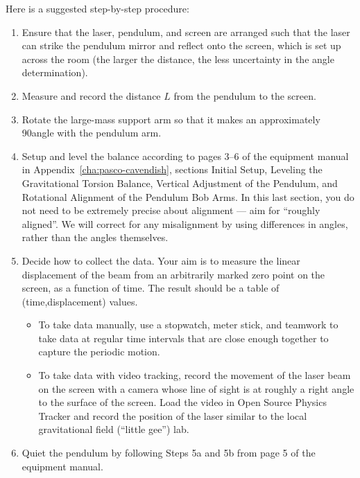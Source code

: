 Here is a suggested step-by-step procedure:
\begin{enumerate}
	
	\item Ensure that the laser, pendulum, and screen are arranged such that the laser can strike the pendulum mirror and reflect onto the screen, which is set up across the room (the larger the distance, the less uncertainty in the angle determination).
	
	\item Measure and record the distance $L$ from the pendulum to the screen.
	
	\item Rotate the large-mass support arm so that it makes an approximately 90\textdegree angle with the pendulum arm.
		
	\item Setup and level the balance according to pages 3--6 of the equipment manual in Appendix~\ref{cha:pasco-cavendish}, sections Initial Setup, Leveling the Gravitational Torsion Balance, Vertical Adjustment of the Pendulum, and Rotational Alignment of the Pendulum Bob Arms. In this last section, you do not need to be extremely precise about alignment --- aim for ``roughly aligned''. We will correct for any misalignment by using differences in angles, rather than the angles themselves.

	\item Decide how to collect the data. Your aim is to measure the linear displacement of the beam from an arbitrarily marked zero point on the screen, as a function of time. The result should be a table of (time,displacement) values.
	\begin{itemize}
		\item To take data manually, use a stopwatch, meter stick, and teamwork to take data at regular time intervals that are close enough together to capture the periodic motion.
	
		\item To take data with video tracking, record the movement of the laser beam on the screen with a camera whose line of sight is at roughly a right angle to the surface of the screen. Load the video in Open Source Physics Tracker and record the position of the laser similar to the local gravitational field (``little gee'') lab.
	\end{itemize}
	
	\item Quiet the pendulum by following Steps 5a and 5b from page 5 of the equipment manual.
	

\end{enumerate}
